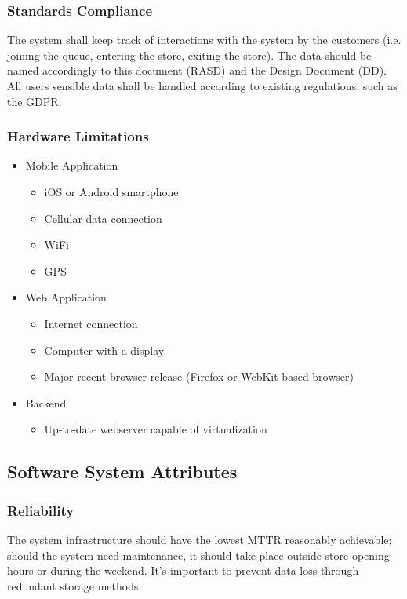 \subsubsection{Standards Compliance}
The system shall keep track of interactions with the system by the customers (i.e. joining the queue, entering the store, exiting the store).
The data should be named accordingly to this document (RASD) and the Design Document (DD).
All users sensible data shall be handled according to existing regulations, such as the GDPR.

\subsubsection{Hardware Limitations}
\begin{itemize}
    \item Mobile Application
    \begin{itemize}
        \item iOS or Android smartphone
        \item Cellular data connection
        \item WiFi
        \item GPS
    \end{itemize}
    \item Web Application
    \begin{itemize}
        \item Internet connection
        \item Computer with a display
        \item Major recent browser release (Firefox or WebKit based browser)
    \end{itemize}
    \item Backend
    \begin{itemize}
        \item Up-to-date webserver capable of virtualization
    \end{itemize}
\end{itemize}

\subsection{Software System Attributes}
\subsubsection{Reliability}
The system infrastructure should have the lowest MTTR reasonably achievable; should the system need maintenance, it should take place outside store opening hours or during the weekend. It's important to prevent data loss through redundant storage methods.

